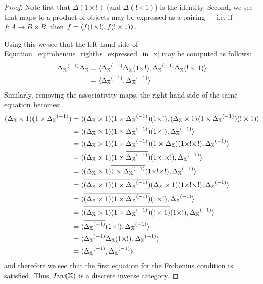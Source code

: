 \begin{proof}
  Note first that $\Delta(1 \times !)$ (and $\Delta(!\times 1)$) is the identity. Second, we see
  that maps to a product of objects may be expressed as a pairing --- i.e.  if
  $f:A \to B \times B$, then $f = \langle f(1\times !), f(!\times 1)\rangle$.

  Using this we see that the left hand side of Equation~\ref{eq:frobenius_righths_expressed_in_x}
  may be computed as follows:
  \begin{align*}
    {\Delta_{\ensuremath{\mathbb{X}}}}^{(-1)} \Delta_{\mathbb{X}}
      & = \langle{\Delta_{\ensuremath{\mathbb{X}}}}^{(-1)} \Delta_{\mathbb{X}}(1\times !), {\Delta_{\mathbb{X}}}^{(-1)} \Delta_{\mathbb{X}} (! \times 1)\rangle\\
    &= \langle{\Delta_{\ensuremath{\mathbb{X}}}}^{(-1)}, {\Delta_{\mathbb{X}}}^{(-1)} \rangle
  \end{align*}
  Similarly, removing the associativity maps, the right hand side of the same equation becomes:
  \begin{align*}
    (\Delta_{\X} \times 1) (1\times\inv{\Delta_{\X}}) &
      = \<(\Delta_{\X} \times 1) (1\times\inv{\Delta_{\X}}) (1\times !),
      (\Delta_{\X} \times 1) (1\times\inv{\Delta_{\X}}) (! \times 1 )\> \\
    &= \<(\Delta_{\X} \times 1) (1\times\inv{\Delta_{\X}}) (1\times ! ), \inv{\Delta_{\X}}\> \\
    &= \<(\Delta_{\X} \times 1) (1\times\inv{\Delta_{\X}}) (1 \times \Delta_{\X})(1\times !\times !), \inv{\Delta_{\X}}\> \\
    &= \<(\Delta_{\X} \times 1) (1\times\rst{\inv{\Delta_{\X}}}) (1\times !\times !), \inv{\Delta_{\X}}\> \\
    &= \<(\Delta_{\X} \times 1) \rst{1\times\inv{\Delta_{\X}}} (1\times !\times !), \inv{\Delta_{\X}}\> \\
    &= \<\rst{(\Delta_{\X} \times 1) (1\times\inv{\Delta_{\X}})}
      (\Delta_{\X} \times 1)(1\times !\times !), \inv{\Delta_{\X}}\> \\ %
    &= \<\rst{(\Delta_{\X} \times 1) (1\times\inv{\Delta_{\X}})} (1\times !), \inv{\Delta_{\X}}\> \\
      &= \<\rst{(\Delta_{\X} \times 1) (1\times\inv{\Delta_{\X}})(! \times 1)} (1\times !),
      \inv{\Delta_{\X}}\> \\ %
    &= \<\rst{\inv{\Delta_{\X}}} (1\times !), \inv{\Delta_{\X}}\> \\
    &= \<\inv{\Delta_{\X}}\Delta_{\X}(1\times !), \inv{\Delta_{\X}}\> \\
    &= \<\inv{\Delta_{\X}}, \inv{\Delta_{\X}}\>
  \end{align*}
  and therefore we see that the first equation for the Frobenius condition is satisfied. Thus,
  $Inv(\mathbb{X})$ is a discrete inverse category.
\end{proof}

